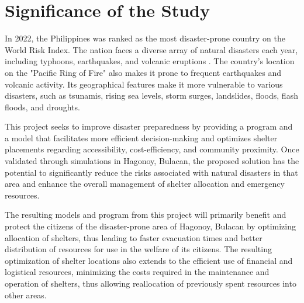 \section{Significance of the Study}

In 2022, the Philippines was ranked as the most disaster-prone country on the World Risk Index. The nation faces a diverse array of natural disasters each year, including typhoons, earthquakes, and volcanic eruptions \parencite{Atwii2022} . The country's location on the "Pacific Ring of Fire" also makes it prone to frequent earthquakes and volcanic activity. Its geographical features make it more vulnerable to various disasters, such as tsunamis, rising sea levels, storm surges, landslides, floods, flash floods, and droughts.
 

This project seeks to improve disaster preparedness by providing a program and a model that facilitates more efficient decision-making and optimizes shelter placements regarding accessibility, cost-efficiency, and community proximity. Once validated through simulations in Hagonoy, Bulacan, the proposed solution has the potential to significantly reduce the risks associated with natural disasters in that area and enhance the overall management of shelter allocation and emergency resources.


The resulting models and program from this project will primarily benefit and protect the citizens of the disaster-prone area of Hagonoy, Bulacan by optimizing allocation of shelters, thus leading to faster evacuation times and better distribution of resources for use in the welfare of its citizens. The resulting optimization of shelter locations also extends to the efficient use of financial and logistical resources, minimizing the costs required in the maintenance and operation of shelters, thus allowing reallocation of previously spent resources into other areas.


